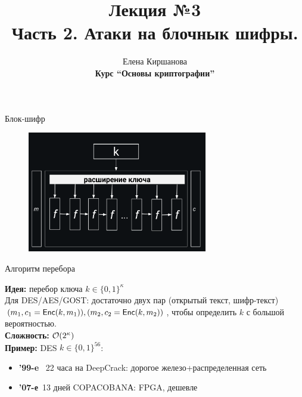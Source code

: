 \documentclass[usenames,dvipsnames,8pt,aspectratio=169]{beamer}
\title{Лекция №3 \\[10pt]
	Часть 2. Атаки на блочнык шифры.}
\date{ Елена Киршанова \\  \textbf{Курс ``Основы криптографии''} \\  }
\begin{document}
	
\begin{frame}
	\titlepage
\end{frame}



\begin{frame}{Блок-шифр}
\begin{figure}
	\includegraphics[width=0.7\textwidth]{BlockCipherGeneral}
\end{figure}

\end{frame}



\begin{frame}{Алгоритм перебора}

\Large
{\color{Orange}\textbf{Идея:}}  перебор ключа $k \in \{0,1\}^{\kappa}$ \\[5pt]
	
	Для DES/AES/GOST:  достаточно двух пар (открытый текст, шифр-текст) $(m_1, c_1 = \textsf{Enc}(k, m_1)), (m_2, c_2=\textsf{Enc}(k,m_2))$, чтобы определить $k$ с большой вероятностью. \\
	
{\color{Orange}\textbf{Сложность:}} $\mathcal{O}(2^{\kappa})$ \\[110pt]



{\color{Orange}\textbf{Пример:}}  DES $k \in \{0,1\}^{56}$:

\begin{itemize}
	\item {\color{Orange}\textbf{'99-e}} ~22 часа на DeepCrack: дорогое железо+распределенная сеть
	\item {\color{Orange}\textbf{'07-е}}~13 дней COPACOBANА: FPGA, дешевле
\end{itemize}
\end{frame}
\end{document}
